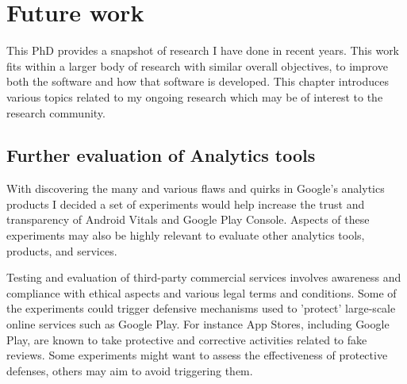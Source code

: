 \chapter{Future work}
\label{chapter-future-work}

This PhD provides a snapshot of research I have done in recent years. This work fits within a larger body of research with similar overall objectives, to improve both the software and how that software is developed. This chapter introduces various topics related to my ongoing research which may be of interest to the research community.

\section{Further evaluation of Analytics tools}

With discovering the many and various flaws and quirks in Google's analytics products I decided a set of experiments would help increase the trust and transparency of Android Vitals and Google Play Console. Aspects of these experiments may also be highly relevant to evaluate other analytics tools, products, and services. 

Testing and evaluation of third-party commercial services involves awareness and compliance with ethical aspects and various legal terms and conditions. Some of the experiments could trigger defensive mechanisms used to 'protect' large-scale online services such as Google Play. For instance App Stores, including Google Play, are known to take protective and corrective activities related to fake reviews. Some experiments might want to assess the effectiveness of protective defenses, others may aim to avoid triggering them. 

